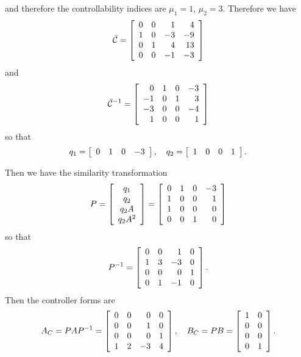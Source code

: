 \documentclass{article}
\begin{document}
and therefore the controllability indices are
$\mu_1 = 1$, $\mu_2 = 3$. Therefore we have
$$
\bar{\mathcal{C}} =
\left[\begin{array}{r r r r}
0 &  0 &  1 &  4 \\
1 &  0 & -3 & -9 \\
0 &  1 &  4 & 13 \\
0 &  0 & -1 & -3
\end{array}\right]
$$
and
$$
\bar{\mathcal{C}}^{-1} =
\left[\begin{array}{r r r r}
  0 &  1 &  0 & -3 \\
 -1 &  0 &  1 &  3 \\
 -3 &  0 &  0 & -4 \\
  1 &  0 &  0 &  1
\end{array}\right]
$$
so that
$$
q_1 =
\left[\begin{array}{r r r r}
  0 & 1 & 0 & -3
\end{array}\right], \quad
q_2 =
\left[\begin{array}{r r r r}
  1 & 0 & 0 & 1
\end{array}\right].
$$

Then we have the similarity transformation
$$
P =
\left[\begin{array}{c}
  q_1   \\
  q_2   \\
  q_2 A \\
  q_2 A^2
\end{array}\right]
=
\left[\begin{array}{r r r r}
   0 & 1 & 0 & -3 \\
   1 & 0 & 0 &  1 \\
   1 & 0 & 0 &  0 \\
   0 & 0 & 1 &  0
\end{array}\right]
$$
so that
$$
P^{-1} =
\left[\begin{array}{r r r r}
  0 & 0 &  1 & 0 \\
  1 & 3 & -3 & 0 \\
  0 & 0 &  0 & 1 \\
  0 & 1 & -1 & 0
\end{array}\right].
$$
Then the controller forms are
$$
A_C
= P A P^{-1}
= \left[\begin{array}{r r r r}
    0 & 0 &  0 & 0 \\
    0 & 0 &  1 & 0 \\
    0 & 0 &  0 & 1 \\
    1 & 2 & -3 & 4
  \end{array}\right], \quad
B_C
= P B
= \left[\begin{array}{r r}
    1 & 0 \\
    0 & 0 \\
    0 & 0 \\
    0 & 1
  \end{array}\right].
$$
\end{document}
